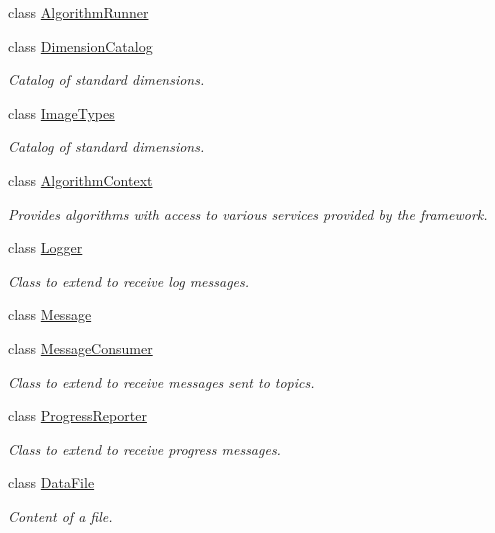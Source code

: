 \begin{DoxyCompactItemize}
class \hyperlink{classBUSBOY_1_1AlgorithmRunner}{AlgorithmRunner}
\item 
class \hyperlink{classBUSBOY_1_1DimensionCatalog}{DimensionCatalog}
\begin{DoxyCompactList}\small\item\em Catalog of standard dimensions. \item\end{DoxyCompactList}\item 
class \hyperlink{classBUSBOY_1_1ImageTypes}{ImageTypes}
\begin{DoxyCompactList}\small\item\em Catalog of standard dimensions. \item\end{DoxyCompactList}\item 
class \hyperlink{classBUSBOY_1_1AlgorithmContext}{AlgorithmContext}
\begin{DoxyCompactList}\small\item\em Provides algorithms with access to various services provided by the framework. \item\end{DoxyCompactList}\item 
class \hyperlink{classBUSBOY_1_1Logger}{Logger}
\begin{DoxyCompactList}\small\item\em Class to extend to receive log messages. \item\end{DoxyCompactList}\item 
class \hyperlink{classBUSBOY_1_1Message}{Message}
\item 
class \hyperlink{classBUSBOY_1_1MessageConsumer}{MessageConsumer}
\begin{DoxyCompactList}\small\item\em Class to extend to receive messages sent to topics. \item\end{DoxyCompactList}\item 
class \hyperlink{classBUSBOY_1_1ProgressReporter}{ProgressReporter}
\begin{DoxyCompactList}\small\item\em Class to extend to receive progress messages. \item\end{DoxyCompactList}\item 
class \hyperlink{classBUSBOY_1_1DataFile}{DataFile}
\begin{DoxyCompactList}\small\item\em Content of a file. \item\end{DoxyCompactList}\item 

\end{DoxyCompactItemize}
